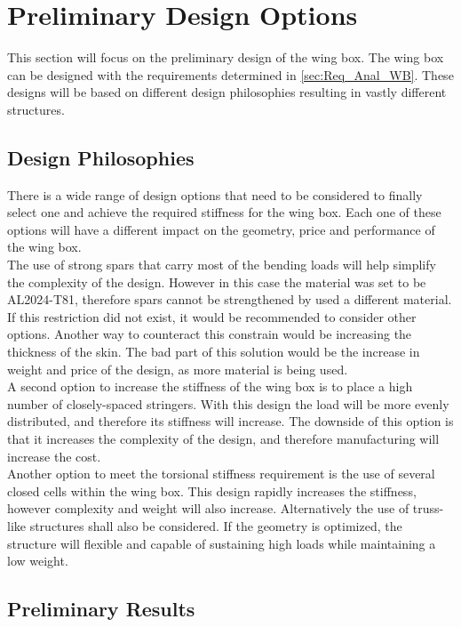 \section{Preliminary Design Options}
\label{sec:Prelim_Des_Ops}
This section will focus on the preliminary design of the wing box. The wing box can be designed with the requirements determined in \autoref{sec:Req_Anal_WB}. These designs will be based on different design philosophies resulting in vastly different structures.

\subsection*{Design Philosophies}
There is a wide range of design options that need to be considered to finally select one and achieve the required stiffness for the wing box. Each one of these options will have a different impact on the geometry, price and performance of the wing box. \\

\noindent The use of strong spars that carry most of the bending loads will help simplify the complexity of the design. However in this case the material was set to be AL2024-T81, therefore spars cannot be strengthened by used a different material. If this restriction did not exist, it would be recommended to consider other options. Another way to counteract this constrain would be increasing the thickness of the skin. The bad part of this solution would be the increase in weight and price of the design, as more material is being used. \\

\noindent A second option to increase the stiffness of the wing box is to place a high number of closely-spaced stringers. With this design the load will be more evenly distributed, and therefore its stiffness will increase. The downside of this option is that it increases the complexity of the design, and therefore manufacturing will increase the cost. \\

\noindent Another option to meet the torsional stiffness requirement is the use of several closed cells within the wing box. This design rapidly increases the stiffness, however complexity and weight will also increase. Alternatively the use of truss-like structures shall also be considered. If the geometry is optimized, the structure will flexible and capable of sustaining high loads while maintaining a low weight. 

\subsection*{Preliminary Results}
